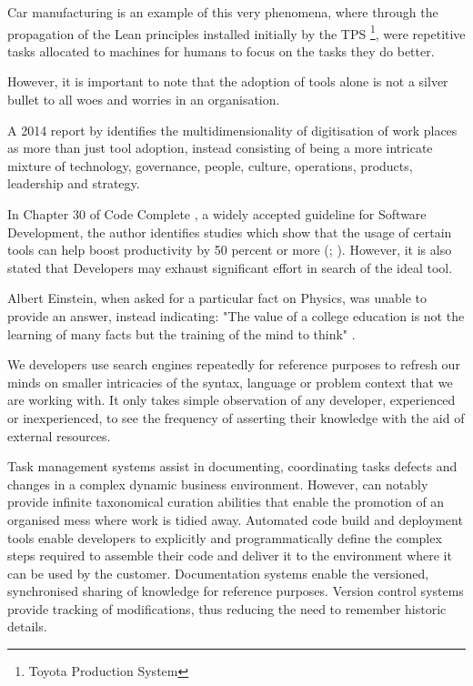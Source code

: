 Car manufacturing is an example of this very phenomena, where through the propagation of the Lean principles installed initially by the TPS \footnote{Toyota Production System}, were repetitive tasks allocated to machines for humans to focus on the tasks they do better.%

However, it is important to note that the adoption of tools alone is not a silver bullet to all woes and worries in an organisation. 

A 2014 report by \citeauthor{azhari2014digital} identifies the multidimensionality of digitisation of work places as more than just tool adoption, instead consisting of being a more intricate mixture of technology, governance, people, culture, operations, products, leadership and strategy.

In Chapter 30 of Code Complete \parencite{codeComplete}, a widely accepted guideline for Software Development, the author identifies studies which show that the usage of certain tools can help boost productivity by 50 percent or more (\cite{jones2000software}; \citeauthor{boehm2000software} \citeyear{boehm2000software}). However, it is also stated that Developers may exhaust significant effort in search of the ideal tool. 

Albert Einstein, when asked for a particular fact on Physics, was unable to provide an answer, instead indicating: "The value of a college education is not the learning of many facts but the training of the mind to think"  \parencite{einstein2011ultimate}.

We developers use search engines repeatedly for reference purposes to refresh our minds on smaller intricacies of the syntax, language or problem context that we are working with. It only takes simple observation of any developer, experienced or inexperienced, to see the frequency of asserting their knowledge with the aid of external resources.

Task management systems assist in documenting, coordinating tasks defects and changes in a complex dynamic business environment. However, can notably provide infinite taxonomical curation abilities that enable the promotion of an organised mess where work is tidied away. Automated code build and deployment tools enable developers to explicitly and programmatically define the complex steps required to assemble their code and deliver it to the environment where it can be used by the customer. Documentation systems enable the versioned, synchronised sharing of knowledge for reference purposes. Version control systems provide tracking of modifications, thus reducing the need to remember historic details.

